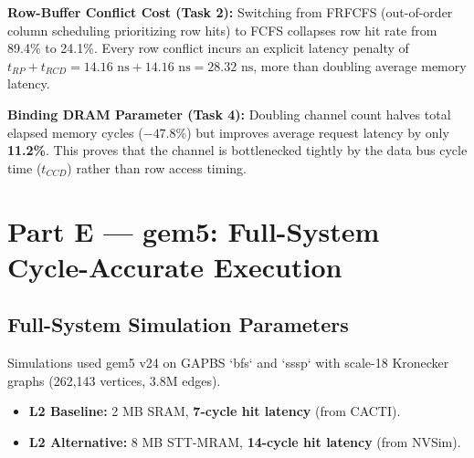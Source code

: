 \documentclass[10pt,a4paper,twocolumn]{article}
\begin{document}
\textbf{Row-Buffer Conflict Cost (Task 2):} Switching from FRFCFS (out-of-order column scheduling prioritizing row hits) to FCFS collapses row hit rate from 89.4\% to 24.1\%. Every row conflict incurs an explicit latency penalty of $t_{RP} + t_{RCD} = 14.16\text{ ns} + 14.16\text{ ns} = 28.32\text{ ns}$, more than doubling average memory latency.

\textbf{Binding DRAM Parameter (Task 4):} Doubling channel count halves total elapsed memory cycles ($-47.8\%$) but improves average request latency by only \textbf{11.2\%}. This proves that the channel is bottlenecked tightly by the data bus cycle time (\textbf{$t_{CCD}$}) rather than row access timing.

\section{Part E — gem5: Full-System Cycle-Accurate Execution}

\subsection{Full-System Simulation Parameters}
Simulations used gem5 v24 on GAPBS `bfs` and `sssp` with scale-18 Kronecker graphs (262,143 vertices, 3.8M edges). 
\begin{itemize}[leftmargin=*]
    \item \textbf{L2 Baseline:} 2 MB SRAM, \textbf{7-cycle hit latency} (from CACTI).
    \item \textbf{L2 Alternative:} 8 MB STT-MRAM, \textbf{14-cycle hit latency} (from NVSim).
\end{itemize}
\end{document}
